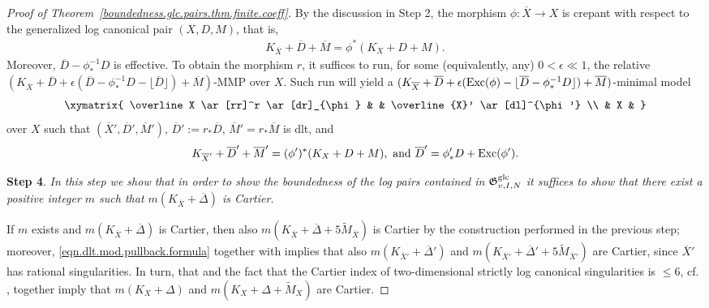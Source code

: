 \documentclass[12pt, a4paper]{amsart}
\newcommand{\setgpairsdcc}[1]{\mathfrak G^{\rm g#1}_{v, I, N}}
\newcounter{Theorem}
\theoremstyle{definition}
\theoremstyle{named}
\begin{document}
\begin{proof}[Proof of Theorem~\ref{boundedness.glc.pairs.thm.finite.coeff}]
By the discussion in Step 2, 
the morphism
$\phi \colon \overline X \to X$
is crepant with respect to the generalized log canonical pair 
$(X, D, M)$,
that is, 
\begin{align}
\label{eqn.logpullback}
K_{\overline{X}}+\overline{D}+\overline{M}
=
\phi^\ast(K_X+D+M). 
\end{align} 
Moreover, 
$\overline D - \phi_{\ast}^{-1}D$
is effective.
To obtain 
the morphism $r$, 
it suffices to run, 
for some (equivalently, any)
$0<\epsilon \ll 1$, 
the relative 
$(K_{\overline{X}}+\overline{D}+\epsilon (\overline D - \phi_\ast^{-1} D - \lfloor \overline D \rfloor)  +\overline{M})$-MMP
over 
$X$.
Such run will yield a $(K_{\overline{X}}+\overline{D}+\epsilon ({\rm Exc}(\phi) - \lfloor \overline D -\phi_\ast^{-1} D \rfloor)  +\overline{M})$-minimal model
\begin{align*}
\xymatrix{
    \overline X \ar[rr]^r \ar[dr]_{\phi} & & \overline{X}' \ar[dl]^{\phi'}
    \\
    & X &
}
\end{align*}
over 
$X$
such that 
$(\overline{X}', \overline{D}', \overline{M}')$, 
$\overline{D}':=
r_\ast \overline{D}$,
$\overline{M}'=
r_\ast \overline{M}$
is dlt, and
\begin{align*}
K_{\overline{X}'}+\overline{D}'+\overline{M}'
=
(\phi')^\ast
(K_X+D+M), 
\
\text{and}
\
\overline{D}' = \phi'_\ast D + {\rm Exc}(\phi').
\end{align*}

\medskip
\fi

{\bf Step 4}.
{\it 
In this step we show that in order to show the boundedness of the log pairs contained in 
$\setgpairsdcc{lc}$
it suffices to show that there exist 
a positive integer 
$m$
such that 
$m(K_{\overline X}+\overline \Delta)$
is Cartier.}

If
$m$ 
exists and 
$m(K_{\overline X}+\overline \Delta)$ 
is Cartier, then 
also 
$m(K_{\overline X}+\overline \Delta+5\widetilde{M}_{\overline X})$ 
is Cartier by the construction performed in the previous step; 
moreover, 
\eqref{eqn.dlt.mod.pullback.formula}
together with 
\cite[\S 4.17, Lemma]{reid.chapter}
implies that also 
$m(K_{\overline X'}+\overline \Delta')$
and
$m(K_{\overline X'}+\overline \Delta'+5\widetilde{M}_{\overline X'})$ 
are Cartier, 
since 
$\overline X'$
has rational singularities.
In turn, that and the fact that the Cartier index of two-dimensional strictly log canonical singularities is $\leq 6$, 
cf. 
\cite{shok.complements},
together imply that 
$m(K_X+\Delta)$
and 
$m(K_X+\Delta+\widetilde{M}_X)$ are Cartier.





\end{proof}
\end{document}
